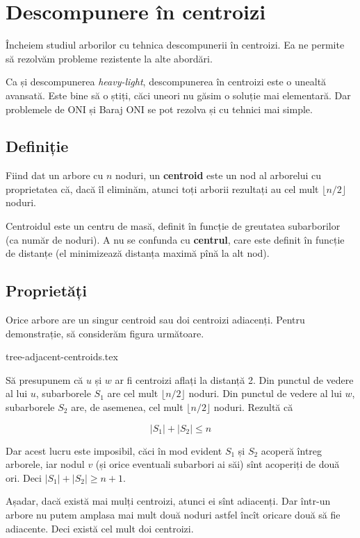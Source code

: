 \documentclass[../main.tex]{subfiles}
\begin{document}
\chapter{Descompunere în centroizi}

Încheiem studiul arborilor cu tehnica descompunerii în centroizi. Ea ne permite să rezolvăm probleme rezistente la alte abordări.

Ca și descompunerea \textit{heavy-light}, descompunerea în centroizi este o unealtă avansată. Este bine să o știți, căci uneori nu găsim o soluție mai elementară. Dar problemele de ONI și Baraj ONI se pot rezolva și cu tehnici mai simple.

\section{Definiție}

Fiind dat un arbore cu $n$ noduri, un \textbf{centroid} este un nod al arborelui cu proprietatea că, dacă îl eliminăm, atunci toți arborii rezultați au cel mult $\lfloor n / 2\rfloor$ noduri.

Centroidul este un centru de masă, definit în funcție de greutatea subarborilor (ca număr de noduri). A nu se confunda cu \textbf{centrul}, care este definit în funcție de distanțe (el minimizează distanța maximă pînă la alt nod).

\section{Proprietăți}

Orice arbore are un singur centroid sau doi centroizi adiacenți. Pentru demonstrație, să considerăm figura următoare.

{tree-adjacent-centroids.tex}

Să presupunem că $u$ și $w$ ar fi centroizi aflați la distanță 2. Din punctul de vedere al lui $u$, subarborele $S_1$ are cel mult $\lfloor n / 2\rfloor$ noduri. Din punctul de vedere al lui $w$, subarborele $S_2$ are, de asemenea, cel mult $\lfloor n / 2\rfloor$ noduri. Rezultă că

$$|S_1| + |S_2| \leq n$$

Dar acest lucru este imposibil, căci în mod evident $S_1$ și $S_2$ acoperă întreg arborele, iar nodul $v$ (și orice eventuali subarbori ai săi) sînt acoperiți de două ori. Deci $|S_1| + |S_2| \geq n + 1$.

Așadar, dacă există mai mulți centroizi, atunci ei sînt adiacenți. Dar într-un arbore nu putem amplasa mai mult două noduri astfel încît oricare două să fie adiacente. Deci există cel mult doi centroizi.
\end{document}
